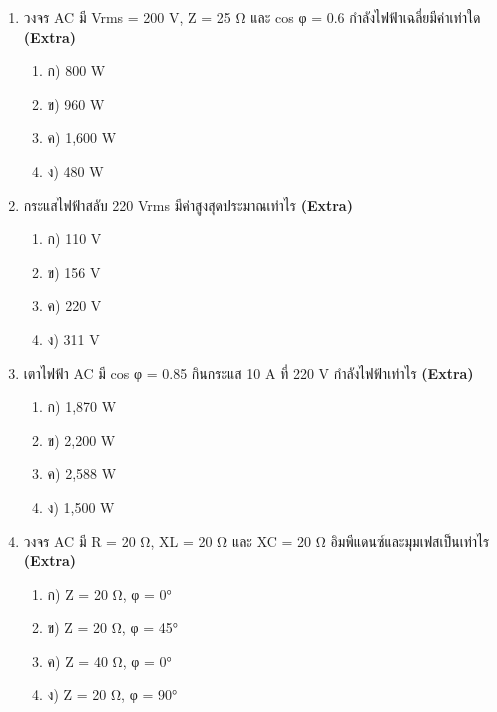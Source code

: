 \documentclass[12pt]{article}
\begin{document}
\begin{enumerate}[label=\arabic*.]
\item วงจร AC มี Vrms = 200 V, Z = 25 Ω และ cos φ = 0.6 กำลังไฟฟ้าเฉลี่ยมีค่าเท่าใด \hfill \textbf{\small (Extra)}
\begin{enumerate}[label=)]
\item ก) 800 W
\item ข) 960 W
\item ค) 1,600 W
\item ง) 480 W
\end{enumerate}
\item กระแสไฟฟ้าสลับ 220 Vrms มีค่าสูงสุดประมาณเท่าไร \hfill \textbf{\small (Extra)}
\begin{enumerate}[label=)]
\item ก) 110 V
\item ข) 156 V
\item ค) 220 V
\item ง) 311 V
\end{enumerate}
\item เตาไฟฟ้า AC มี cos φ = 0.85 กินกระแส 10 A ที่ 220 V กำลังไฟฟ้าเท่าไร \hfill \textbf{\small (Extra)}
\begin{enumerate}[label=)]
\item ก) 1,870 W
\item ข) 2,200 W
\item ค) 2,588 W
\item ง) 1,500 W
\end{enumerate}
\item วงจร AC มี R = 20 Ω, XL = 20 Ω และ XC = 20 Ω อิมพีแดนซ์และมุมเฟสเป็นเท่าไร \hfill \textbf{\small (Extra)}
\begin{enumerate}[label=)]
\item ก) Z = 20 Ω, φ = 0°
\item ข) Z = 20 Ω, φ = 45°
\item ค) Z = 40 Ω, φ = 0°
\item ง) Z = 20 Ω, φ = 90°
\end{enumerate}
\end{enumerate}
\end{document}
